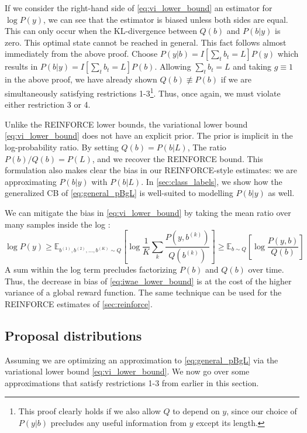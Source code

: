 \documentclass{article}
\begin{document}
If we consider the right-hand side of \cref{eq:vi_lower_bound} an estimator for
$\log P(y)$, we can see that the estimator is biased unless both sides are
equal. This can only occur when the KL-divergence between $Q(b)$ and $P(b|y)$
is zero. This optimal state cannot be reached in general. This fact follows
almost immediately from the above proof. Choose $P(y|b) = I[\sum_t b_t = L]
P(y)$ which results in $P(b|y) = I[\sum_t b_t = L] P(b)$. Allowing $\sum_t b_t
= L$ and taking $g \equiv 1$ in the above proof, we have already shown $Q(b)
\not \equiv P(b)$ if we are simultaneously satisfying restrictions
1-3\footnote{
%
    This proof clearly holds if we also allow $Q$ to depend on $y$, since our
    choice of $P(y|b)$ precludes any useful information from $y$ except its
    length.
%
}. Thus, once again, we must violate either restriction 3 or 4.

Unlike the REINFORCE lower bounds, the variational lower bound
\cref{eq:vi_lower_bound} does not have an explicit prior. The prior is implicit
in the log-probability ratio. By setting $Q(b) = P(b|L)$, The ratio $P(b) /
Q(b) = P(L)$, and we recover the REINFORCE bound. This formulation also makes
clear the bias in our REINFORCE-style estimates: we are approximating $P(b|y)$
with $P(b|L)$. In \cref{sec:class_labels}, we show how the generalized CB of
\cref{eq:general_pBgL} is well-suited to modelling $P(b|y)$ as well.

We can mitigate the bias in \cref{eq:vi_lower_bound} by taking the mean ratio
over many samples inside the log
\cite{burdaImportanceWeightedAutoencoders2016}:
%
\begin{equation} \label{eq:iwae_lower_bound}
    \log P(y) \geq \mathbb{E}_{b^{(1)}, b^{(2)}, \ldots, b^{(K)} \sim Q} \left[
        \log \frac{1}{K} \sum_k \frac{P(y, b^{(k)})}{Q(b^{(k)})} \right]
    \geq \mathbb{E}_{b \sim Q} \left[\log \frac{P(y, b)}{Q(b)}\right]
\end{equation}
%
A sum within the log term precludes factorizing $P(b)$ and $Q(b)$ over time.
Thus, the decrease in bias of \cref{eq:iwae_lower_bound} is at the cost of
the higher variance of a global reward function. The same technique can be used
for the REINFORCE estimates of \cref{sec:reinforce}.

\subsection{Proposal distributions} \label{sec:proposal}

Assuming we are optimizing an approximation to \cref{eq:general_pBgL} via
the variational lower bound \cref{eq:vi_lower_bound}. We now go over some
approximations that satisfy restrictions 1-3 from earlier in this section.
\end{document}
